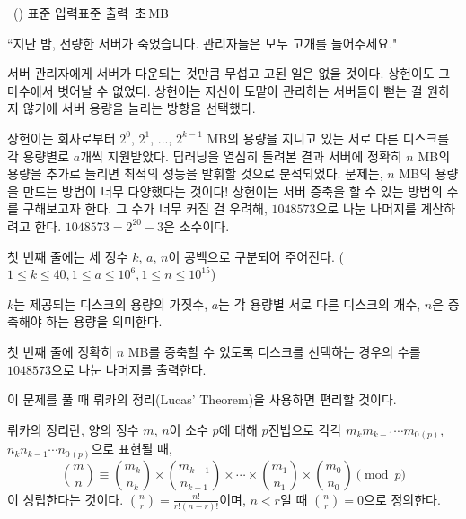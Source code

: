 \begin{problem}{\kcpcprobserver\ (\kcpcprobservershort)}
    {표준 입력}{표준 출력}
    {\kcpcprobservertime\,초}{\kcpcprobservermemory\,MB}{}
    
    ``지난 밤, 선량한 서버가 죽었습니다. 관리자들은 모두 고개를 들어주세요."
    
    서버 관리자에게 서버가 다운되는 것만큼 무섭고 고된 일은 없을 것이다. 상헌이도 그 마수에서 벗어날 수 없었다. 상헌이는 자신이 도맡아 관리하는 서버들이 뻗는 걸 원하지 않기에 서버 용량을 늘리는 방향을 선택했다.
    
    상헌이는 회사로부터 $2^0$, $2^1$, ..., $2^{k-1}$ MB의 용량을 지니고 있는 서로 다른 디스크를 각 용량별로 $a$개씩 지원받았다. 딥러닝을 열심히 돌려본 결과 서버에 정확히 $n$ MB의 용량을 추가로 늘리면 최적의 성능을 발휘할 것으로 분석되었다. 문제는, $n$ MB의 용량을 만드는 방법이 너무 다양했다는 것이다! 상헌이는 서버 증축을 할 수 있는 방법의 수를 구해보고자 한다. 그 수가 너무 커질 걸 우려해, $1048573$으로 나눈 나머지를 계산하려고 한다. 
    $1048573 = 2^{20} - 3$은 소수이다.
    
    \InputFile
    첫 번째 줄에는 세 정수 $k$, $a$, $n$이 공백으로 구분되어 주어진다. ($1 \leq k \leq 40, 1 \leq a \leq 10^6, 1 \leq n \leq 10^{15}$)
    
    $k$는 제공되는 디스크의 용량의 가짓수, $a$는 각 용량별 서로 다른 디스크의 개수, $n$은 증축해야 하는 용량을 의미한다.
    
    \OutputFile
    첫 번째 줄에 정확히 $n$ MB를 증축할 수 있도록 디스크를 선택하는 경우의 수를 $1048573$으로 나눈 나머지를 출력한다.
    
    \Examples
    \begin{example}
    \end{example}
    
    \Note
    이 문제를 풀 때 뤼카의 정리(Lucas' Theorem)을 사용하면 편리할 것이다. 
    
    뤼카의 정리란, 양의 정수 $m$, $n$이 소수 $p$에 대해 $p$진법으로 각각 $m_{k}m_{k-1}\cdots m_{0}{_{(p)}}$, $n_{k}n_{k-1}\cdots n_{0}{_{(p)}}$으로 표현될 때,
    $$
    \binom{m}{n} \equiv \binom{m_k}{n_k} \times \binom{m_{k-1}}{n_{k-1}} \times \cdots \times \binom{m_1}{n_1} \times \binom{m_0}{n_0} \pmod p
    $$
    이 성립한다는 것이다. $\binom{n}{r} = \frac{n!}{r!(n-r)!}$이며, $n < r$일 때 $\binom{n}{r} = 0$으로 정의한다.
    

\end{problem}
